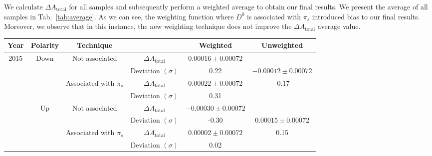\documentclass{article}
\begin{document}
        We calculate $\Delta A_\text{total}$ for all samples and subsequently perform a weighted average to obtain our final results.
        We present the average of all samples in Tab.~\ref{tab:average}.
        As we can see, the weighting function where $D^0$ is associated with $\pi_s$ introduced bias to our final results.
        Moreover, we observe that in this instance, the new weighting technique does not improve the $\Delta A_\text{total}$ average value.

        \begin{center}
                \begin{tabular}{c|c|c|c|c|c}
                        Year & Polarity & Technique & & Weighted & Unweighted\\
                        \hline\hline
                        \multirow{8}{*}{2015} & \multirow{4}{*}{Down} & \multirow{2}{*}{Not associated} & $\Delta A_\text{total}$ & $0.00016\pm 0.00072$& \\
                        & & & Deviation $(\sigma)$ & 0.22& $-0.00012\pm 0.00072$\\
                        \cline{3-5}
                        & & \multirow{2}{*}{Associated with $\pi_s$} & $\Delta A_\text{total}$ & $0.00022\pm 0.00072$& -0.17\\
                        & & & Deviation $(\sigma)$ & 0.31& \\
                        \cline{2-6}
                        & \multirow{4}{*}{Up} & \multirow{2}{*}{Not associated} & $\Delta A_\text{total}$ & $-0.00030\pm 0.00072$& \\
                        & & & Deviation $(\sigma)$ & -0.30& $0.00015\pm 0.00072$\\
                        \cline{3-5}
                        & & \multirow{2}{*}{Associated with $\pi_s$} & $\Delta A_\text{total}$ & $0.00002\pm 0.00072$& 0.15\\
                        & & & Deviation $(\sigma)$ & 0.02& \\
                        \hline


\end{tabular}
\end{center}
\end{document}
